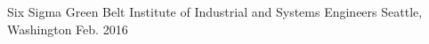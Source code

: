 



\begin{cvhonors}

  \cvhonor
    {Six Sigma Green Belt} %
    {Institute of Industrial and Systems Engineers} %
    {Seattle, Washington} %
    {Feb. 2016} %

\end{cvhonors}


